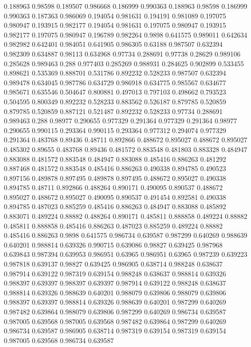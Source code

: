 0.188963 0.98598
0.189507 0.986668
0.186999 0.990363
0.188963 0.98598
0.186999 0.990363
0.187363 0.986069
0.194054 0.981631
0.194191 0.981089
0.197075 0.980947
0.193915 0.982177
0.194054 0.981631
0.197075 0.980947
0.193915 0.982177
0.197075 0.980947
0.196789 0.982264
0.9898 0.641575
0.989011 0.642634
0.982982 0.642401
0.984051 0.641905
0.986305 0.63188
0.987507 0.632394
0.982309 0.634887
0.98113 0.634968
0.97734 0.288691
0.97738 0.28629
0.989106 0.285628
0.989463 0.288
0.977403 0.285269
0.988931 0.284625
0.902899 0.533455
0.898621 0.535369
0.888701 0.531786
0.892232 0.528233
0.987507 0.632394
0.989478 0.634045
0.987786 0.634729
0.986918 0.634775
0.985567 0.634677
0.985671 0.635546
0.504647 0.800881
0.497013 0.797103
0.498662 0.793523
0.504595 0.800349
0.892232 0.528233
0.883562 0.526187
0.879785 0.520859
0.879785 0.520859
0.887121 0.521487
0.892232 0.528233
0.97734 0.288691
0.989463 0.288
0.98977 0.290655
0.977329 0.291364
0.977329 0.291364
0.98977 0.290655
0.990115 0.293364
0.990115 0.293364
0.977312 0.294074
0.977329 0.291364
0.483768 0.89436
0.48711 0.892866
0.488672 0.895027
0.488672 0.895027
0.485302 0.89655
0.483768 0.89436
0.481572 0.883548
0.481803 0.883328
0.484947 0.883088
0.481572 0.883548
0.484947 0.883088
0.485416 0.886263
0.481292 0.887468
0.481572 0.883548
0.485416 0.886263
0.490338 0.894785
0.490523 0.897156
0.489878 0.897495
0.489878 0.897495
0.488672 0.895027
0.490338 0.894785
0.48711 0.892866
0.488264 0.890171
0.490095 0.890537
0.488672 0.895027
0.488672 0.895027
0.490095 0.890537
0.491454 0.892581
0.490338 0.894785
0.487023 0.885259
0.485416 0.886263
0.484947 0.883088
0.485892 0.883071
0.489224 0.88882
0.488264 0.890171
0.485811 0.888858
0.489224 0.88882
0.485811 0.888858
0.485416 0.886263
0.487023 0.885259
0.489224 0.88882
0.485416 0.886263
0.9898 0.641575
0.986734 0.639587
0.987299 0.640269
0.988639 0.640201
0.988814 0.639326
0.990715 0.639086
0.98827 0.639425
0.987968 0.639843
0.987394 0.639953
0.986951 0.63965
0.986951 0.63965
0.987239 0.639223
0.987818 0.639137
0.98827 0.639425
0.986905 0.638714
0.988248 0.638637
0.987914 0.639122
0.987319 0.639154
0.988248 0.638637
0.988814 0.639326
0.988397 0.639397
0.988397 0.639397
0.987914 0.639122
0.988248 0.638637
0.988814 0.639326
0.988639 0.640201
0.988079 0.639806
0.988079 0.639806
0.988397 0.639397
0.988814 0.639326
0.988639 0.640201
0.987299 0.640269
0.987482 0.639864
0.988079 0.639806
0.987299 0.640269
0.986734 0.639587
0.987005 0.639568
0.987005 0.639568
0.987482 0.639864
0.987299 0.640269
0.986734 0.639587
0.986905 0.638714
0.987319 0.639154
0.987319 0.639154
0.987005 0.639568
0.986734 0.639587
